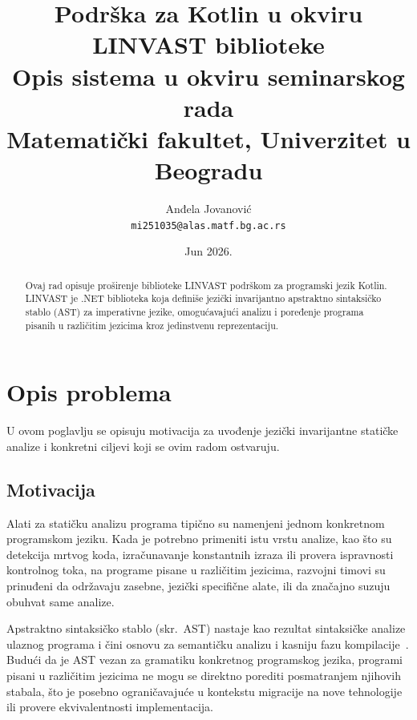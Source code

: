 \documentclass[a4paper]{article}
\begin{document}
\title{Podrška za Kotlin u okviru LINVAST biblioteke\\
\small{Opis sistema u okviru seminarskog rada\\
Matematički fakultet, Univerzitet u Beogradu}}
\author{Anđela Jovanović\\
\texttt{mi251035@alas.matf.bg.ac.rs}}
\date{Jun 2026.}

\maketitle
\begin{abstract}
Ovaj rad opisuje proširenje biblioteke LINVAST podrškom za programski jezik
Kotlin. LINVAST je .NET biblioteka koja definiše jezički invarijantno
apstraktno sintaksičko stablo (AST) za imperativne jezike, omogućavajući
analizu i poređenje programa pisanih u različitim jezicima kroz jedinstvenu
reprezentaciju.
\end{abstract}
\tableofcontents
\newpage

\section{Opis problema}

U ovom poglavlju se opisuju motivacija za uvođenje jezički invarijantne statičke
analize i konkretni ciljevi koji se ovim radom ostvaruju.

\subsection{Motivacija}

Alati za statičku analizu programa tipično su namenjeni jednom konkretnom
programskom jeziku. Kada je potrebno primeniti istu vrstu analize, kao što su
detekcija mrtvog koda, izračunavanje konstantnih izraza ili provera ispravnosti
kontrolnog toka, na programe pisane u različitim jezicima, razvojni timovi su
prinuđeni da održavaju zasebne, jezički specifične alate, ili da značajno suzuju
obuhvat same analize.

\vspace{2px}
Apstraktno sintaksičko stablo (skr.~AST) nastaje kao rezultat sintaksičke
analize ulaznog programa i čini osnovu za semantičku analizu i kasniju fazu
kompilacije~\cite{ristovic2020}. Budući da je AST vezan za gramatiku konkretnog
programskog jezika, programi pisani u različitim jezicima ne mogu se direktno
porediti posmatranjem njihovih stabala, što je posebno ograničavajuće u
kontekstu migracije na nove tehnologije ili provere ekvivalentnosti implementacija.
\end{document}
